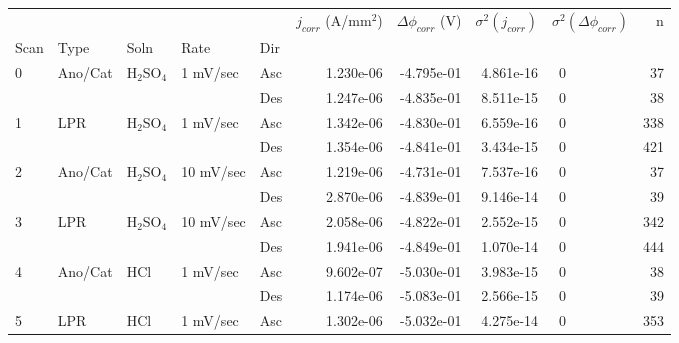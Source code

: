 \begin{tabular}{lllllrrrlr}
\toprule
  &     &     &           &     &  $j_{corr}$ (A/mm$^2$) &  $\Delta \phi_{corr}$ (V) &  $\sigma^2(j_{corr})$ & $\sigma^2(\Delta \phi_{corr})$ &    n \\
Scan & Type & Soln & Rate & Dir &                        &                           &                       &                                &      \\
\midrule
0 & Ano/Cat & H$_2$SO$_4$ & 1 mV/sec & Asc &              1.230e-06 &                -4.795e-01 &             4.861e-16 &                             ~0 &   37 \\
  &     &     &           & Des &              1.247e-06 &                -4.835e-01 &             8.511e-15 &                             ~0 &   38 \\
1 & LPR & H$_2$SO$_4$ & 1 mV/sec & Asc &              1.342e-06 &                -4.830e-01 &             6.559e-16 &                             ~0 &  338 \\
  &     &     &           & Des &              1.354e-06 &                -4.841e-01 &             3.434e-15 &                             ~0 &  421 \\
2 & Ano/Cat & H$_2$SO$_4$ & 10 mV/sec & Asc &              1.219e-06 &                -4.731e-01 &             7.537e-16 &                             ~0 &   37 \\
  &     &     &           & Des &              2.870e-06 &                -4.839e-01 &             9.146e-14 &                             ~0 &   39 \\
3 & LPR & H$_2$SO$_4$ & 10 mV/sec & Asc &              2.058e-06 &                -4.822e-01 &             2.552e-15 &                             ~0 &  342 \\
  &     &     &           & Des &              1.941e-06 &                -4.849e-01 &             1.070e-14 &                             ~0 &  444 \\
4 & Ano/Cat & HCl & 1 mV/sec & Asc &              9.602e-07 &                -5.030e-01 &             3.983e-15 &                             ~0 &   38 \\
  &     &     &           & Des &              1.174e-06 &                -5.083e-01 &             2.566e-15 &                             ~0 &   39 \\
5 & LPR & HCl & 1 mV/sec & Asc &              1.302e-06 &                -5.032e-01 &             4.275e-14 &                             ~0 &  353 \\

\end{tabular}
